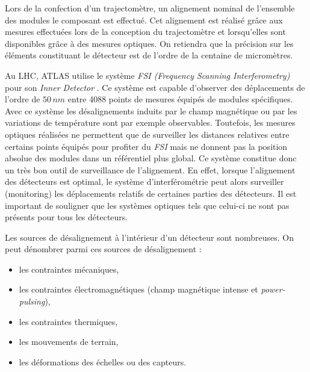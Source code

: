    \medskip
   
   Lors de la confection d'un trajectom\`etre, un alignement nominal de l'ensemble des modules le composant est effectu\'e. Cet alignement est r\'ealis\'e gr\^ace aux mesures effectu\'ees lors de la conception du trajectom\`etre et lorsqu'elles sont disponibles gr\^ace \`a des mesures optiques. On retiendra que la pr\'ecision sur les \'el\'ements constituant le détecteur est de l'ordre de la centaine de microm\`etres.
  
  \medskip
  
   Au LHC, ATLAS utilise le syst\`eme \textit{FSI (Frequency Scanning Interferometry)} pour son \textit{Inner Detector} \cite{Gibson:2010cia}. Ce syst\`eme est capable d'observer des d\'eplacements de l'ordre de $50 \, nm$ entre 4088 points de mesures \'equipés de modules sp\'ecifiques. Avec ce syst\`eme les d\'esalignements induits par le champ magn\'etique ou par les variations de temp\'erature sont par exemple observables. Toutefois, les mesures optiques r\'ealis\'ees ne permettent que de surveiller les distances relatives entre certains points \'equipés pour profiter du \textit{FSI} mais ne donnent pas la position absolue des modules dans un r\'ef\'erentiel plus global. Ce syst\`eme constitue donc un très bon outil de surveillance de l'alignement. En effet, lorsque l'alignement des d\'etecteurs est optimal, le syst\`eme d'interf\'erom\'etrie peut alors surveiller (monitoring) les d\'eplacements relatifs de certaines parties des d\'etecteurs. Il est important de souligner que les syst\`emes optiques tels que celui-ci ne sont pas pr\'esents pour tous les d\'etecteurs.
   
  \medskip
   
   Les sources de d\'esalignement \`a l'int\'erieur d'un d\'etecteur sont nombreuses. On peut d\'enombrer parmi ces sources de d\'esalignement :
   
  \medskip
  
  \renewcommand{\labelitemi}{$\bullet$}
  
  \begin{itemize}
   \item les contraintes m\'ecaniques,
   \item les contraintes \'electromagn\'etiques (champ magn\'etique intense et \textit{power-pulsing}),
   \item les contraintes thermiques,
   \item les mouvements de terrain,
   \item les d\'eformations des \'echelles ou des capteurs.
   \end{itemize}
   
